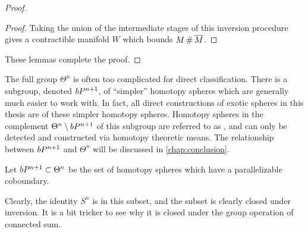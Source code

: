 \begin{proof}
\begin{proof}

		\noindent
		Taking the union of the intermediate stages of this inversion procedure gives a contractible manifold $W$ which bounds $M\+\overline{M}$.
	\end{proof}

	\noindent
	These lemmas complete the proof.
\end{proof}


The full group $\Theta^n$ is often too complicated for direct classification. There is a subgroup, denoted $bP^{n+1}$, of ``simpler'' homotopy spheres which are generally much easier to work with. In fact, all direct constructions of exotic spheres in this thesis are of these simpler homotopy spheres. Homotopy spheres in the complement $\Theta^n\setminus bP^{n+1}$ of this subgroup are referred to as , and can only be detected and constructed via homotopy theoretic means. The relationship between $bP^{n+1}$ and $\Theta^n$ will be discussed in \cref{chap:conclusion}.

\begin{definition}
	Let $bP^{n+1}\subset \Theta^n$ be the set of homotopy spheres which have a parallelizable coboundary.
\end{definition}

Clearly, the identity $S^n$ is in this subset, and the subset is clearly closed under inversion. It is a bit tricker to see why it is closed under the group operation of connected sum. 

